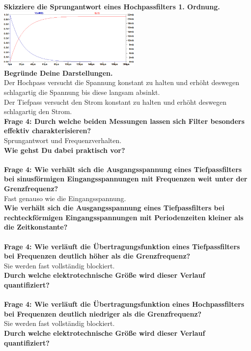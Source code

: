 \documentclass[11pt,a4paper]{scrartcl}
\begin{document}
\textbf{Skizziere die Sprungantwort eines Hochpassfilters 1. Ordnung.}\\
\includegraphics[width=7cm]{sprung_hochpass.png}\\
\textbf{Begründe Deine Darstellungen.}\\
Der Hochpass versucht die Spannung konstant zu halten und erhöht deswegen schlagartig die Spannung bis diese langsam absinkt.\\
Der Tiefpass versucht den Strom konstant zu halten und erhöht deswegen schlagartig den Strom.\\
\textbf{Frage 4: Durch welche beiden Messungen lassen sich Filter besonders effektiv charakterisieren?}\\
Sprungantwort und Frequenzverhalten.\\
\textbf{Wie gehst Du dabei praktisch vor?}\\
\\
\textbf{Frage 4: Wie verhält sich die Ausgangsspannung eines Tiefpassfilters bei sinusförmigen Eingangsspannungen mit Frequenzen weit unter der Grenzfrequenz?}\\
Fast genauso wie die Eingangsspannung.\\
\textbf{Wie verhält sich die Ausgangsspannung eines Tiefpassfilters bei rechteckförmigen Eingangsspannungen mit Periodenzeiten kleiner als die Zeitkonstante?}\\
\\
\textbf{Frage 4: Wie verläuft die Übertragungsfunktion eines Tiefpassfilters bei Frequenzen deutlich höher als die Grenzfrequenz?}\\
Sie werden fast vollständig blockiert.\\
\textbf{Durch welche elektrotechnische Größe wird dieser Verlauf quantifiziert?}\\
\\
\textbf{Frage 4: Wie verläuft die Übertragungsfunktion eines Hochpassfilters bei Frequenzen deutlich niedriger als die Grenzfrequenz?}\\
Sie werden fast vollständig blockiert.\\
\textbf{Durch welche elektrotechnische Größe wird dieser Verlauf quantifiziert?}\\
\\
\end{document}

